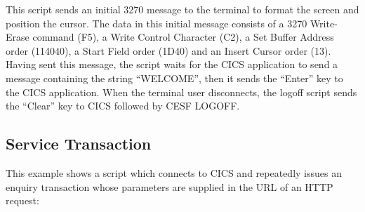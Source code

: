 \documentclass[letterpaper,10pt,english]{sphinxmanual}
\begin{document}

This script sends an initial 3270 message to the terminal to format the screen and position the cursor. The data in this initial message consists of a 3270 Write-Erase command (F5), a Write Control Character (C2), a Set Buffer Address order (114040), a Start Field order (1D40) and an Insert Cursor order (13). Having sent this message, the script waits for the CICS application to send a message containing the string “WELCOME”, then it sends the “Enter” key to the CICS application. When the terminal user disconnects, the logoff script sends the “Clear” key to CICS followed by CESF LOGOFF.

\ignorespaces 

\subsection{Service Transaction}
\label{\detokenize{connectivity_guide:service-transaction}}\label{\detokenize{connectivity_guide:index-128}}
This example shows a script which connects to CICS and repeatedly issues an enquiry transaction whose parameters are supplied in the URL of an HTTP request:
\end{document}
